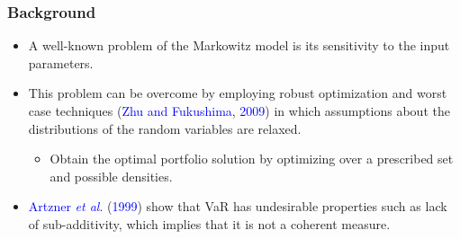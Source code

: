 \documentclass[pdf,10pt,xcolor=dvipsnames,hide notes]{beamer}
\begin{document}
\begin{frame}[label=frame1d]
	\frametitle{Background}
	
	\begin{itemize}
		 \setlength{\parskip}{15pt}
		\justifying
		
		
	\item<1> A well-known problem of the Markowitz model is its sensitivity to the input parameters. 
		
	\item<1> This problem can be overcome by employing robust optimization and worst case techniques (\textcolor{blue}{Zhu and Fukushima}, \textcolor{blue}{2009}) in which assumptions about the distributions of the random variables are relaxed. 
	\setlength{\parskip}{0pt}
	\begin{itemize}
		\item Obtain the optimal portfolio solution by optimizing over a prescribed set and possible densities.
	\end{itemize}

\setlength{\parskip}{15pt}

\item<2>  \textcolor{blue}{Artzner \emph{et al}}. (\textcolor{blue}{1999}) show that VaR has undesirable properties such as lack of sub-additivity, which implies that it is not a coherent measure.
		
\end{itemize}
	
\end{frame}

				
\end{document}
